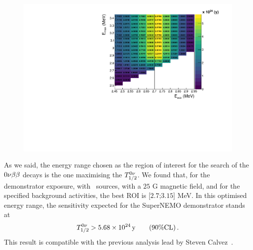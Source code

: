\begin{figure}[h]
  \centering
  \includegraphics[width=1.1\textwidth]{Sensitivity/fig_sensitivity/sensitivity_spectrum_with_B_82Se.pdf}
  \caption{
    \label{fig:sensitivity_ROI}}
\end{figure}
As we said, the energy range chosen as the region of interest for the search of the $0\nu\beta\beta$ decays is the one maximising the $T_{1/2}^{0\nu}$.
We found that, for the demonstrator exposure, with \Se\ sources, with a $25$ G magnetic field, and for the specified background activities, the best ROI is [$2.7$;$3.15$] MeV.
In this optimised energy range, the sensitivity expected for the SuperNEMO demonstrator stands at
\begin{equation}
T_{1/2}^{0\nu} > 5.68\times 10^{24}\,\text{y}\qquad (90\% \text{CL})\,.
\end{equation}
This result is compatible with the previous analysis lead by Steven Calvez~\cite{CalvezThesis}.



